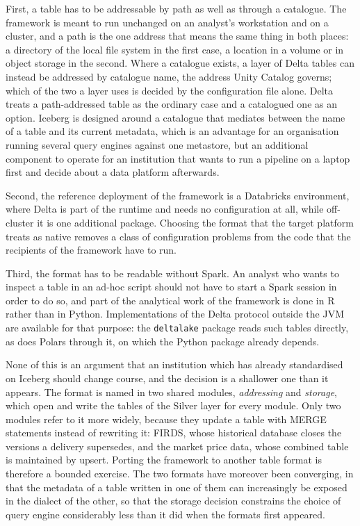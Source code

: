 \documentclass[a4paper, 11pt]{report}
\begin{document}
First, a table has to be addressable by path as well as through a catalogue. The framework is meant to run unchanged on an analyst's workstation and on a cluster, and a path is the one address that means the same thing in both places: a directory of the local file system in the first case, a location in a volume or in object storage in the second. Where a catalogue exists, a layer of Delta tables can instead be addressed by catalogue name, the address Unity Catalog governs; which of the two a layer uses is decided by the configuration file alone. Delta treats a path-addressed table as the ordinary case and a catalogued one as an option. Iceberg is designed around a catalogue that mediates between the name of a table and its current metadata, which is an advantage for an organisation running several query engines against one metastore, but an additional component to operate for an institution that wants to run a pipeline on a laptop first and decide about a data platform afterwards.

Second, the reference deployment of the framework is a Databricks environment, where Delta is part of the runtime and needs no configuration at all, while off-cluster it is one additional package. Choosing the format that the target platform treats as native removes a class of configuration problems from the code that the recipients of the framework have to run.

Third, the format has to be readable without Spark. An analyst who wants to inspect a table in an ad-hoc script should not have to start a Spark session in order to do so, and part of the analytical work of the framework is done in R rather than in Python. Implementations of the Delta protocol outside the JVM are available for that purpose: the \verb|deltalake| package reads such tables directly, as does Polars through it, on which the Python package already depends.

None of this is an argument that an institution which has already standardised on Iceberg should change course, and the decision is a shallower one than it appears. The format is named in two shared modules, \emph{addressing} and \emph{storage}, which open and write the tables of the Silver layer for every module. Only two modules refer to it more widely, because they update a table with MERGE statements instead of rewriting it: FIRDS, whose historical database closes the versions a delivery supersedes, and the market price data, whose combined table is maintained by upsert. Porting the framework to another table format is therefore a bounded exercise. The two formats have moreover been converging, in that the metadata of a table written in one of them can increasingly be exposed in the dialect of the other, so that the storage decision constrains the choice of query engine considerably less than it did when the formats first appeared.
\end{document}
